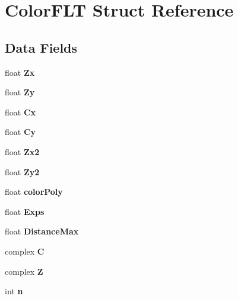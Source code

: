 \hypertarget{struct_color_f_l_t}{}\section{Color\+F\+LT Struct Reference}
\label{struct_color_f_l_t}
\subsection*{Data Fields}
\begin{DoxyCompactItemize}
\item 
\mbox{\label{struct_color_f_l_t_a70cc5d58d2522cdf732cf5d3756756f8}} 
float {\bfseries Zx}
\item 
\mbox{\label{struct_color_f_l_t_a644638d709023a61d56084c27e2f6f40}} 
float {\bfseries Zy}
\item 
\mbox{\label{struct_color_f_l_t_af4d84f668f31ebdd414ddb19d7e42f8a}} 
float {\bfseries Cx}
\item 
\mbox{\label{struct_color_f_l_t_a17d65d9420a8ed144559a9d3d591b680}} 
float {\bfseries Cy}
\item 
\mbox{\label{struct_color_f_l_t_ab6416bbb2cc0ab236531be916e97bd66}} 
float {\bfseries Zx2}
\item 
\mbox{\label{struct_color_f_l_t_a533873f42823fa007535eccbcb1d95c1}} 
float {\bfseries Zy2}
\item 
\mbox{\label{struct_color_f_l_t_a9ac4dfc637230f01cc278625e4c08f63}} 
float {\bfseries color\+Poly}
\item 
\mbox{\label{struct_color_f_l_t_a142bf1562c32e79af417a8258e764514}} 
float {\bfseries Exps}
\item 
\mbox{\label{struct_color_f_l_t_a1a49b8e86d11b8179e100d356198f186}} 
float {\bfseries Distance\+Max}
\item 
\mbox{\label{struct_color_f_l_t_ad9f2932b326bd90c655bce9b24424efb}} 
complex {\bfseries C}
\item 
\mbox{\label{struct_color_f_l_t_aa4795f7bd4044069e9b534be7cceb117}} 
complex {\bfseries Z}
\item 
\mbox{\label{struct_color_f_l_t_a43254e86f118bc92dd21f5a58013e7e4}} 
int {\bfseries n}
\end{DoxyCompactItemize}



